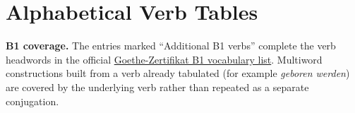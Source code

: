 \chapter{Alphabetical Verb Tables}

\begin{tcolorbox}[colback=referenceBlueBg,colframe=genderMasculine]
\textbf{B1 coverage.} The entries marked ``Additional B1 verbs'' complete the
verb headwords in the official
\href{https://www.goethe.de/pro/relaunch/prf/pt/br/Goethe-Zertifikat_B1_Wortliste.pdf}{Goethe-Zertifikat B1 vocabulary list}.
Multiword constructions built from a verb already tabulated (for example
\emph{geboren werden}) are covered by the underlying verb rather than repeated
as a separate conjugation.
\end{tcolorbox}



































































